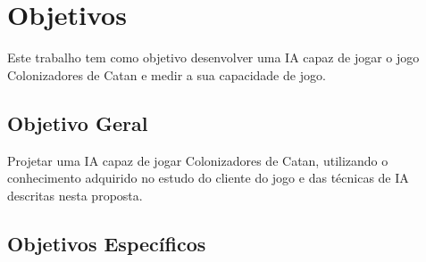 






\chapter{\label{chap:objetivos}Objetivos}

Este trabalho tem como objetivo desenvolver uma IA capaz de jogar o jogo Colonizadores de Catan e medir a sua capacidade de jogo.

\section{\label{sec:gerais}Objetivo Geral}

Projetar uma IA capaz de jogar Colonizadores de Catan, utilizando o conhecimento adquirido no estudo do cliente do jogo e das técnicas de IA descritas nesta proposta.


\section{\label{sec:espec}Objetivos Específicos}

